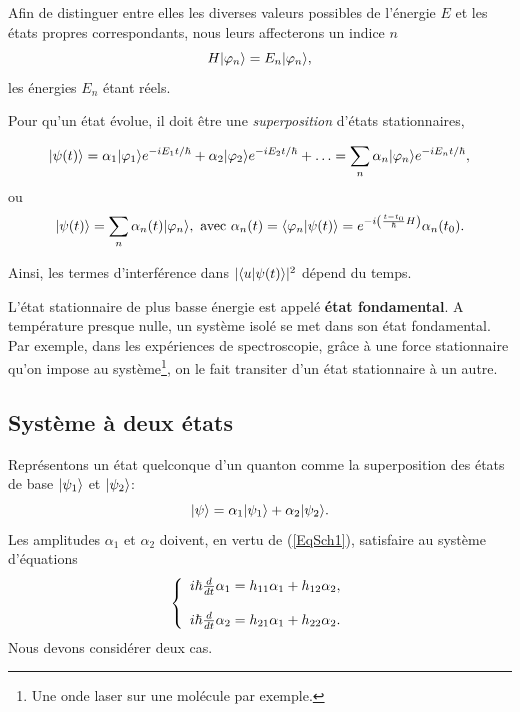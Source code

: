 Afin de distinguer entre elles les diverses valeurs possibles de l'énergie $E$
et les états propres correspondants, nous leurs affecterons un indice $n$%
\begin{equation}
H\vert\varphi_n\rangle =E_n\vert\varphi_n\rangle,
\end{equation}
les énergies $E_n$ étant réels.

Pour qu'un état évolue, il doit être une \emph{superposition} d'états
stationnaires,

\medskip
\colorbox[gray]{0.8}{
\parbox[c]{0.9\textwidth}{
\begin{equation}
\vert\psi(t)\rangle=\alpha_1\vert\varphi_1\rangle e^{-iE_1t/\hbar}+\alpha_2\vert
\varphi_2\rangle e^{-iE_2t/\hbar}+\ldots=\sum_n\alpha_n\vert\varphi_n\rangle
e^{-iE_nt/\hbar},
\end{equation}
ou
\begin{equation}
 \vert\psi(t)\rangle=\sum_n\alpha_n(t)\vert\varphi_n\rangle,\text{ avec }
\alpha_n(t)=\langle
\varphi_n\vert\psi(t)\rangle=e^{-i\left(\frac{t-t_0}{\hbar}H\right)}
\alpha_n(t_0).
\end{equation}
}}
\medskip

Ainsi, les termes d'interférence dans $|\langle u\vert\psi(t)\rangle|^{2}$ dépend du
temps.

L'état stationnaire de plus basse énergie est appelé \textbf{état
fondamental}. A température presque nulle, un système isolé se met dans son
état fondamental. Par exemple, dans les expériences de spectroscopie, grâce à
une force stationnaire qu'on impose au système\footnote{Une onde laser sur une
molécule par exemple.}, on le fait transiter d'un état stationnaire à un autre.


\subsection{Système à deux états}

Représentons un état quelconque d'un quanton comme la superposition des états
de base $\vert\psi_1\rangle$ et $\vert\psi_2\rangle$:%
\begin{equation}
\vert\psi\rangle=\alpha_1\vert\psi_1\rangle+\alpha_2\vert\psi_2\rangle.
\end{equation}
Les amplitudes $\alpha_1$ et $\alpha_2$ doivent, en vertu de (\ref{EqSch1}),
satisfaire au système d'équations%
\begin{equation}
\left\{
\begin{array}
[c]{c}%
i\hbar\frac{d}{dt}\alpha_1=h_{11}\alpha_1+h_{12}\alpha_2,\\
\\
i\hbar\frac{d}{dt}\alpha_2=h_{21}\alpha_1+h_{22}\alpha_2.
\end{array}
\right.
\label{eq:SysEqAmpl}%
\end{equation}
Nous devons considérer deux cas.

